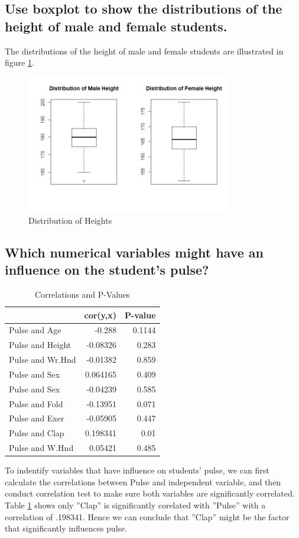 \documentclass[12pt]{article}
\begin{document}
\subsection{Use boxplot to show the distributions of the height of male and female students.}
The distributions of the height of male and female students are illustrated in figure \ref{distribution1}. 

\begin{figure}[!ht]
	\centering
	\includegraphics[width=0.8\textwidth]{Rplot.png}
	\caption{Distribution of Heights}
	\label{distribution1}
\end{figure}

\subsection{Which numerical variables might have an influence on the student's pulse?}
\begin{table}[htbp]
  \centering
  \caption{Correlations and P-Values }
      \begin{tabular}{lrr}
                \toprule[1.5pt]
          & \multicolumn{1}{l}{cor(y,x)} & \multicolumn{1}{l}{P-value} \\
          \toprule[1.5pt]
    Pulse and Age & -0.288 & 0.1144 \\
    Pulse and Height & -0.08326 & 0.283 \\
    Pulse and Wr.Hnd & -0.01382 & 0.859 \\
    Pulse and Sex & 0.064165 & 0.409 \\
    Pulse and Sex & -0.04239 & 0.585 \\
    Pulse and Fold & -0.13951 & 0.071 \\
    Pulse and Exer & -0.05905 & 0.447 \\
    Pulse and Clap & 0.198341 & 0.01 \\
    Pulse and W.Hnd & 0.05421 & 0.485 \\
              \toprule[1.5pt]
        \end{tabular}%
  \label{cor}%
\end{table}%
To indentify variables that have influence on students' pulse, we can first calculate the correlations between Pulse and independent variable, and then conduct correlation test to make sure both variables are significantly correlated. Table \ref{cor} shows only ''Clap'' is significantly corelated with ''Pulse'' with a correlation of .198341. Hence we can conclude that ''Clap'' might be the factor that significantly influences pulse.
\end{document}
